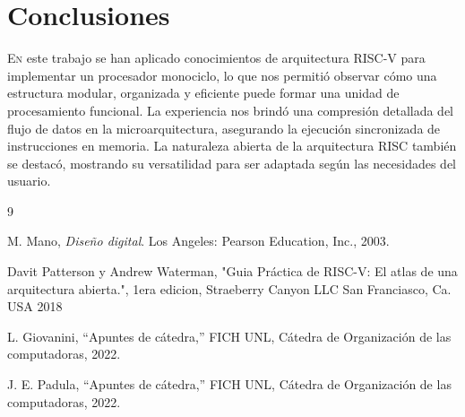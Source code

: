 \documentclass{article}
\begin{document}
\section{Conclusiones}
\lettrine{E}{n} este trabajo se han aplicado conocimientos de arquitectura RISC-V para implementar un procesador monociclo, lo que nos permitió observar cómo una estructura modular, organizada y eficiente puede formar una unidad de procesamiento funcional. La experiencia nos brindó una compresión detallada del flujo de datos en la microarquitectura, asegurando la ejecución sincronizada de instrucciones en memoria. La naturaleza abierta de la arquitectura RISC también se destacó, mostrando su versatilidad para ser adaptada según las necesidades del usuario.

\begin{thebibliography}{9} 

     M. Mano, \textit{Diseño digital}. Los Angeles: Pearson Education, Inc., 2003.

    Davit Patterson y Andrew Waterman, "Guia Práctica de RISC-V: El atlas de una arquitectura abierta.", 1era edicion, Straeberry Canyon LLC San Franciasco, Ca. USA 2018
    
     L. Giovanini, ``Apuntes de cátedra,'' FICH UNL, Cátedra de Organización de las computadoras, 2022.
    
     J. E. Padula, ``Apuntes de cátedra,'' FICH UNL, Cátedra de Organización de las computadoras, 2022.

\end{thebibliography}
\end{document}
